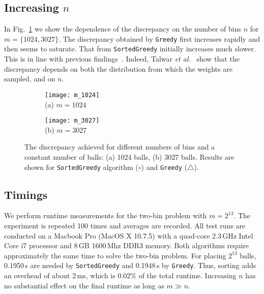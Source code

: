 \documentclass[12pt,psfig,a4]{article}
\newcommand{\sg}{\texttt{SortedGreedy}}
\newcommand{\gr}{\texttt{Greedy}}
\theoremstyle{plain}
\begin{document}
\subsection{Increasing $n$}

 In Fig.~\ref{fig:gaps_bins} we show the dependence of the discrepancy on the number of bins $n$ for $m=\{1024,3027\}$. The discrepancy obtained by \gr{} first increases rapidly and then seems to saturate. That from \sg{} initially increases much slower. This is in line with previous findings~\cite{talwar2007balanced}. Indeed, Talwar \textit{et al.}~\cite{talwar2007balanced} show that the discrepancy depends on both the distribution from which the weights are sampled, and on $n$.


\begin{figure}
\centering
	\begin{subfigure}[b]{0.49\textwidth}	
	      	\texttt{[image: m\_1024]} \\
		\centering (a) $m=1024$
	\end{subfigure} 
	\begin{subfigure}[b]{0.49\textwidth}	
	      	\texttt{[image: m\_3027]} \\
		\centering (b) $m=3027$
	\end{subfigure} 
	\caption{The discrepancy achieved for different numbers of bins and a constant number of balls: (a) 1024 balls, (b) 3027 balls. Results are shown for \sg{} algorithm ($\circ$) and \gr{} ($\triangle$).} 
	\label{fig:gaps_bins}
\end{figure}


\subsection{Timings}

We perform runtime measurements for the two-bin problem with $m=2^{13}$. The experiment is repeated 100 times and averages are recorded. All test runs are conducted on a Macbook Pro (MacOS X 10.7.5) with a quad-core 2.3\,GHz Intel Core i7 processor and 8\,GB 1600\,Mhz DDR3 memory. Both algorithms require approximately the same time to solve the two-bin problem. For placing $2^{13}$ balls, 0.1950\,s are needed by \sg{} and 0.1948\,s by \gr{}. Thus, sorting adds an overhead of about 2\,ms, which is $0.02\%$ of the total runtime. Increasing $n$ has no substantial effect on the final runtime as long as $m\gg n$. \\
\end{document}
